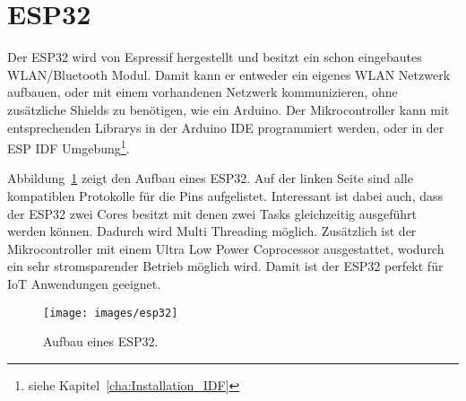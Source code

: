 \section{ESP32}
Der ESP32 wird von Espressif hergestellt und besitzt ein schon eingebautes WLAN/Bluetooth Modul. Damit kann er entweder ein eigenes WLAN Netzwerk aufbauen, oder mit einem vorhandenen Netzwerk kommunizieren, ohne zusätzliche Shields zu benötigen, wie ein Arduino. Der Mikrocontroller kann mit entsprechenden Librarys in der Arduino IDE programmiert werden, oder in der ESP IDF Umgebung\footnote{siehe Kapitel~\ref{cha:Installation_IDF}}.

Abbildung~\ref{fig:esp32} zeigt den Aufbau eines ESP32. Auf der linken Seite sind alle kompatiblen Protokolle für die Pins aufgelistet. Interessant ist dabei auch, dass der ESP32 zwei Cores besitzt mit denen zwei Tasks gleichzeitig ausgeführt werden können. Dadurch wird Multi Threading möglich. Zusätzlich ist der Mikrocontroller mit einem Ultra Low Power Coprocessor ausgestattet, wodurch ein sehr stromsparender Betrieb möglich wird. Damit ist der ESP32 perfekt für IoT Anwendungen geeignet.

\begin{figure}[hbt]
	\centering
	\texttt{[image: images/esp32]}
	\caption[ESP32 Aufbau]{Aufbau eines ESP32.}
	\label{fig:esp32}
\end{figure}
